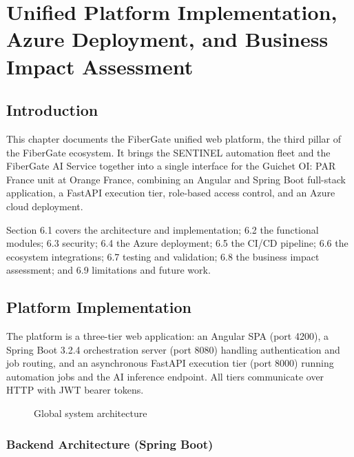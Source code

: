 \chapter{Unified Platform Implementation, Azure Deployment, and Business Impact Assessment}

\section*{Introduction}

This chapter documents the FiberGate unified web platform, the third pillar of the FiberGate ecosystem. It brings the SENTINEL automation fleet and the FiberGate AI Service together into a single interface for the Guichet OI: PAR France unit at Orange France, combining an Angular and Spring Boot full-stack application, a FastAPI execution tier, role-based access control, and an Azure cloud deployment.

Section 6.1 covers the architecture and implementation; 6.2 the functional modules; 6.3 security; 6.4 the Azure deployment; 6.5 the CI/CD pipeline; 6.6 the ecosystem integrations; 6.7 testing and validation; 6.8 the business impact assessment; and 6.9 limitations and future work.

\bigskip

\section{Platform Implementation}

The platform is a three-tier web application: an Angular SPA (port 4200), a Spring Boot 3.2.4 orchestration server (port 8080) handling authentication and job routing, and an asynchronous FastAPI execution tier (port 8000) running automation jobs and the AI inference endpoint. All tiers communicate over HTTP with JWT bearer tokens.

\begin{figure}[H]
  \centering
  \caption{Global system architecture}
  \label{fig:architecture}
\end{figure}

\subsection{Backend Architecture (Spring Boot)}

